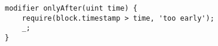 \begin{lstlisting}[language=Solidity]
modifier onlyAfter(uint time) {
    require(block.timestamp > time, 'too early');
    _;
}
\end{lstlisting}